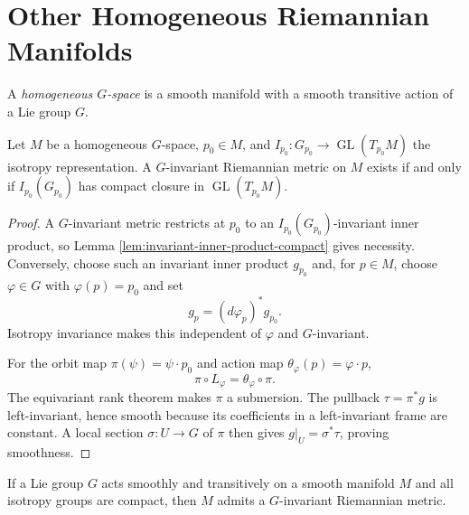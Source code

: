 \section{Other Homogeneous Riemannian Manifolds}

A \emph{homogeneous $G$-space} is a smooth manifold with a smooth transitive
action of a Lie group $G$.

\begin{theorem}
\label{thm:existence-invariant-metrics-homogeneous-spaces}




Let $M$ be a homogeneous $G$-space, $p_0\in M$, and
$I_{p_0}\colon G_{p_0}\to\operatorname{GL}(T_{p_0}M)$ the isotropy
representation. A $G$-invariant Riemannian metric on $M$ exists if and only if
$I_{p_0}(G_{p_0})$ has compact closure in
$\operatorname{GL}(T_{p_0}M)$.
\end{theorem}
\begin{proof}
\sketch A $G$-invariant metric restricts at $p_0$ to an
$I_{p_0}(G_{p_0})$-invariant inner product, so Lemma
\ref{lem:invariant-inner-product-compact} gives necessity. Conversely, choose
such an invariant inner product $g_{p_0}$ and, for $p\in M$, choose
$\varphi\in G$ with $\varphi(p)=p_0$ and set
\[
g_p=(d\varphi_p)^*g_{p_0}.
\]
Isotropy invariance makes this independent of $\varphi$ and $G$-invariant.

For the orbit map $\pi(\psi)=\psi\cdot p_0$ and action map
$\theta_\varphi(p)=\varphi\cdot p$,
\begin{equation}
\pi\circ L_\varphi=\theta_\varphi\circ\pi. \tag{3.17}
\end{equation}
The equivariant rank theorem makes $\pi$ a submersion. The pullback
$\tau=\pi^*g$ is left-invariant, hence smooth because its coefficients in a
left-invariant frame are constant. A local section $\sigma\colon U\to G$ of
$\pi$ then gives $g|_U=\sigma^*\tau$, proving smoothness.
\end{proof}

\begin{corollary}
\label{cor:invariant-metric-compact-isotropy}

If a Lie group $G$ acts smoothly and transitively on a smooth manifold $M$ and
all isotropy groups are compact, then $M$ admits a $G$-invariant Riemannian
metric.
\end{corollary}

